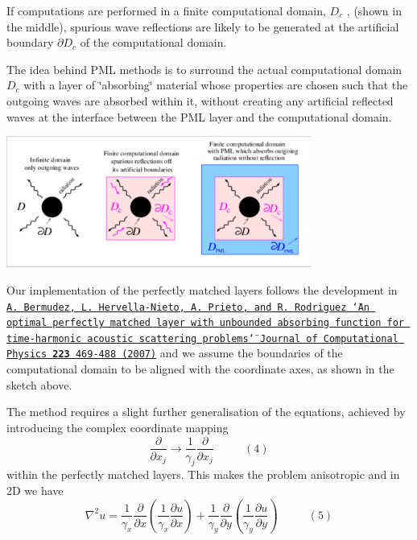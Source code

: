 If computations are performed in a finite computational domain, $ D_c $ , (shown in the middle), spurious wave reflections are likely to be generated at the artificial boundary $ \partial D_c $ of the computational domain.

The idea behind P\+ML methods is to surround the actual computational domain $ D_c $ with a layer of \char`\"{}absorbing\char`\"{} material whose properties are chosen such that the outgoing waves are absorbed within it, without creating any artificial reflected waves at the interface between the P\+ML layer and the computational domain.

 
\begin{DoxyImage}
\includegraphics[width=0.75\textwidth]{pml}
\end{DoxyImage}


Our implementation of the perfectly matched layers follows the development in \href{http://www.sciencedirect.com/science/article/pii/S0021999106004487}{\tt A. Bermudez, L. Hervella-\/\+Nieto, A. Prieto, and R. Rodriguez \char`\"{}\+An optimal perfectly matched layer with unbounded 
absorbing function for time-\/harmonic acoustic scattering problems\char`\"{} Journal of Computational Physics {\bfseries 223} 469-\/488 (2007)} and we assume the boundaries of the computational domain to be aligned with the coordinate axes, as shown in the sketch above.

The method requires a slight further generalisation of the equations, achieved by introducing the complex coordinate mapping \[ \frac{\partial}{\partial x_j} \to \frac{1}{\gamma_j} \frac{\partial}{\partial x_j} \ \ \ \ \ \ \ \ \ \ \ \ (4) \] within the perfectly matched layers. This makes the problem anisotropic and in 2D we have \[ \nabla ^ 2 u = \frac{1}{\gamma_x}\frac{\partial}{\partial x} \left( \frac{1}{\gamma_x}\frac{\partial u}{\partial x} \right) + \frac{1}{\gamma_y}\frac{\partial}{\partial y}\left( \frac{1}{\gamma_y}\frac{\partial u}{\partial y}\right) \ \ \ \ \ \ \ \ \ \ \ \ (5) \]

